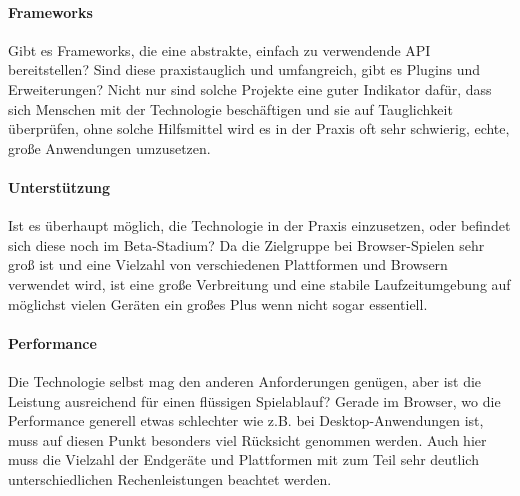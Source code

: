 \documentclass[a4paper, 12pt]{article}
\begin{document}
\paragraph{Frameworks}
Gibt es Frameworks, die eine abstrakte, einfach zu verwendende API bereitstellen? Sind diese praxistauglich und umfangreich, gibt es Plugins und Erweiterungen? Nicht nur sind solche Projekte eine guter Indikator dafür, dass sich Menschen mit der Technologie beschäftigen und sie auf Tauglichkeit überprüfen, ohne solche Hilfsmittel wird es in der Praxis oft sehr schwierig, echte, große Anwendungen umzusetzen.
\paragraph{Unterstützung}
Ist es überhaupt möglich, die Technologie in der Praxis einzusetzen, oder befindet sich diese noch im Beta-Stadium? Da die Zielgruppe bei Browser-Spielen sehr groß ist und eine Vielzahl von verschiedenen Plattformen und Browsern verwendet wird, ist eine große Verbreitung und eine stabile Laufzeitumgebung auf möglichst vielen Geräten ein großes Plus wenn nicht sogar essentiell.
\paragraph{Performance}
Die Technologie selbst mag den anderen Anforderungen genügen, aber ist die Leistung ausreichend für einen flüssigen Spielablauf? Gerade im Browser, wo die Performance generell etwas schlechter wie z.B. bei Desktop-Anwendungen ist, muss auf diesen Punkt besonders viel Rücksicht genommen werden. Auch hier muss die Vielzahl der Endgeräte und Plattformen mit zum Teil sehr deutlich unterschiedlichen Rechenleistungen beachtet werden.
\end{document}
